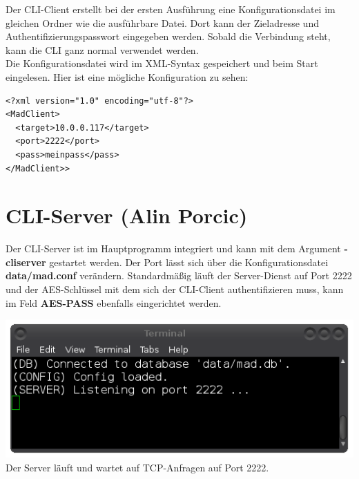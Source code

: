 \documentclass[12pt,a4paper]{report}
\begin{document}
\begin{onehalfspace}
Der CLI-Client erstellt bei der ersten Ausführung eine Konfigurationsdatei im gleichen Ordner wie die ausführbare Datei. Dort kann der Zieladresse und Authentifizierungspasswort eingegeben werden. Sobald die Verbindung steht, kann die CLI ganz normal verwendet werden.\\
Die Konfigurationsdatei wird im XML-Syntax gespeichert und beim Start eingelesen. Hier ist eine mögliche Konfiguration zu sehen:\\
\begin{lstlisting}
<?xml version="1.0" encoding="utf-8"?>
<MadClient>
  <target>10.0.0.117</target>
  <port>2222</port>
  <pass>meinpass</pass>
</MadClient>>
\end{lstlisting}

\chapter{CLI-Server (Alin Porcic)}

Der CLI-Server ist im Hauptprogramm integriert und kann mit dem Argument \textbf{-cliserver} gestartet werden. Der Port lässt sich über die Konfigurationsdatei \textbf{data/mad.conf} verändern. Standardmäßig läuft der Server-Dienst auf Port 2222 und der AES-Schlüssel mit dem sich der CLI-Client authentifizieren muss, kann im Feld \textbf{AES-PASS} ebenfalls eingerichtet werden.

\begin{center}
\includegraphics[scale=0.6]{img/cli_server.png}\\
Der Server läuft und wartet auf TCP-Anfragen auf Port 2222.
\end{center}


\end{onehalfspace}
\end{document}
